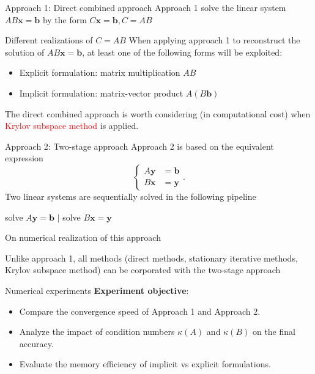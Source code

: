 \documentclass[aspectratio=169]{beamer}
\begin{document}
\begin{frame}{Approach 1: Direct combined approach}
	Approach 1 solve the linear system $ AB \bm{x} = \bm{b}$ by the form $C \bm{x} = \bm{b}, C = AB$ 
	\begin{block}{Different realizations of $C=AB$}
	When applying approach 1 to reconstruct the solution of $AB \bm{x} = \bm{b}$, at least one of the following forms will be exploited:
	\begin{itemize}
		\item Explicit formulation: matrix multiplication $AB$
		\item Implicit formulation: matrix-vector product  $A(B \bm{b})$
	\end{itemize}
\end{block}
The direct combined approach is worth considering (in computational cost) when \textcolor{red}{Krylov subspace method} is applied.
\end{frame}
\begin{frame}{Approach 2: Two-stage approach}
	Approach 2 is based on the equivalent expression
	\begin{equation}
	\begin{cases}
		A \bm{y}& = \bm{b}\\
		B \bm{x} & = \bm{y}
	\end{cases}
	.
	\end{equation}
Two linear systems are sequentially solved in the following pipeline
\begin{center}
solve $A \bm{y} = \bm{b}$ $|$ solve $B \bm{x} = \bm{y}$
\end{center}
\begin{block}{On numerical realization of this approach}

Unlike approach 1, all methods (direct methods, stationary iterative methods, Krylov subspace method) can be corporated with the two-stage approach
\end{block}
\end{frame}
\begin{frame}{Numerical experiments}
	\textbf{Experiment objective}:	
	\begin{itemize}
		\item Compare the convergence speed of Approach 1 and Approach 2.
		\item Analyze the impact of condition numbers $\kappa(A)$ and $\kappa(B)$ on the final accuracy.
		\item Evaluate the memory efficiency of implicit vs explicit formulations.
	\end{itemize}
\end{frame}
\end{document}
